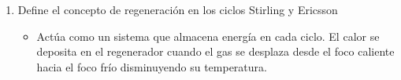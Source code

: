 \documentclass{article}
\begin{document}
\begin{enumerate}
    \item Define el concepto de regeneración en los ciclos Stirling y Ericsson
        \begin{itemize}
            \item  Actúa como un sistema que almacena energía en cada ciclo. El calor se deposita en el regenerador cuando el gas se desplaza desde el foco caliente hacia el foco frío disminuyendo su temperatura.
        \end{itemize}

\end{enumerate}
\end{document}
